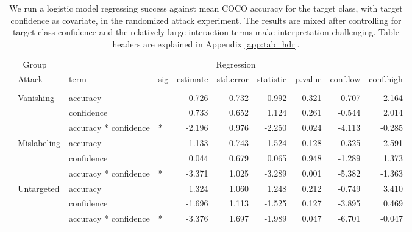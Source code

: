 \begin{longtable}[t]{llllrrrrrr}
\caption{\label{tab:target_success_table}We run a logistic model regressing success against mean COCO accuracy for the target class, with target confidence as covariate, in the randomized attack experiment. The results are mixed after controlling for target class confidence and the relatively large interaction terms make interpretation challenging. Table headers are explained in Appendix \ref{app:tab_hdr}.}\\
\toprule
\multicolumn{2}{c}{Group} & \multicolumn{8}{c}{Regression} \\
\cmidrule(l{3pt}r{3pt}){1-2} \cmidrule(l{3pt}r{3pt}){3-10}
 & Attack & term & sig & estimate & std.error & statistic & p.value & conf.low & conf.high\\
\midrule
\addlinespace[0.3em]
\multicolumn{10}{l}{\textbf{YOLOv3}}\\
\hspace{1em} & Vanishing & accuracy &  & 0.726 & 0.732 & 0.992 & 0.321 & -0.707 & 2.164\\
\cmidrule{3-10}\nopagebreak
\hspace{1em} &  & confidence &  & 0.733 & 0.652 & 1.124 & 0.261 & -0.544 & 2.014\\
\cmidrule{3-10}\nopagebreak
\hspace{1em} &  & accuracy * confidence & * & -2.196 & 0.976 & -2.250 & 0.024 & -4.113 & -0.285\\
\cmidrule{2-10}\nopagebreak
\hspace{1em} & Mislabeling & accuracy &  & 1.133 & 0.743 & 1.524 & 0.128 & -0.325 & 2.591\\
\cmidrule{3-10}\nopagebreak
\hspace{1em} &  & confidence &  & 0.044 & 0.679 & 0.065 & 0.948 & -1.289 & 1.373\\
\cmidrule{3-10}\nopagebreak
\hspace{1em} &  & accuracy * confidence & * & -3.371 & 1.025 & -3.289 & 0.001 & -5.382 & -1.363\\
\cmidrule{2-10}\nopagebreak
\hspace{1em} & Untargeted & accuracy &  & 1.324 & 1.060 & 1.248 & 0.212 & -0.749 & 3.410\\
\cmidrule{3-10}\nopagebreak
\hspace{1em} &  & confidence &  & -1.696 & 1.113 & -1.525 & 0.127 & -3.895 & 0.469\\
\cmidrule{3-10}\nopagebreak
\hspace{1em} &  & accuracy * confidence & * & -3.376 & 1.697 & -1.989 & 0.047 & -6.701 & -0.047\\

\end{longtable}

